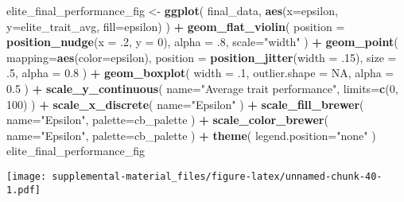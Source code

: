 \documentclass[]{book}
\newenvironment{Shaded}{\begin{snugshade}}{\end{snugshade}}
\newcommand{\DataTypeTok}[1]{\textcolor[rgb]{0.13,0.29,0.53}{#1}}
\newcommand{\DecValTok}[1]{\textcolor[rgb]{0.00,0.00,0.81}{#1}}
\newcommand{\FloatTok}[1]{\textcolor[rgb]{0.00,0.00,0.81}{#1}}
\newcommand{\KeywordTok}[1]{\textcolor[rgb]{0.13,0.29,0.53}{\textbf{#1}}}
\newcommand{\NormalTok}[1]{#1}
\newcommand{\OperatorTok}[1]{\textcolor[rgb]{0.81,0.36,0.00}{\textbf{#1}}}
\newcommand{\OtherTok}[1]{\textcolor[rgb]{0.56,0.35,0.01}{#1}}
\newcommand{\StringTok}[1]{\textcolor[rgb]{0.31,0.60,0.02}{#1}}
\begin{document}
\begin{Shaded}
\begin{Highlighting}[]
\NormalTok{elite_final_performance_fig <-}\StringTok{ }\KeywordTok{ggplot}\NormalTok{(}
\NormalTok{    final_data,}
    \KeywordTok{aes}\NormalTok{(}\DataTypeTok{x=}\NormalTok{epsilon, }\DataTypeTok{y=}\NormalTok{elite_trait_avg, }\DataTypeTok{fill=}\NormalTok{epsilon)}
\NormalTok{  ) }\OperatorTok{+}
\StringTok{  }\KeywordTok{geom_flat_violin}\NormalTok{(}
    \DataTypeTok{position =} \KeywordTok{position_nudge}\NormalTok{(}\DataTypeTok{x =} \FloatTok{.2}\NormalTok{, }\DataTypeTok{y =} \DecValTok{0}\NormalTok{),}
    \DataTypeTok{alpha =} \FloatTok{.8}\NormalTok{,}
    \DataTypeTok{scale=}\StringTok{"width"}
\NormalTok{  ) }\OperatorTok{+}
\StringTok{  }\KeywordTok{geom_point}\NormalTok{(}
    \DataTypeTok{mapping=}\KeywordTok{aes}\NormalTok{(}\DataTypeTok{color=}\NormalTok{epsilon),}
    \DataTypeTok{position =} \KeywordTok{position_jitter}\NormalTok{(}\DataTypeTok{width =} \FloatTok{.15}\NormalTok{),}
    \DataTypeTok{size =} \FloatTok{.5}\NormalTok{,}
    \DataTypeTok{alpha =} \FloatTok{0.8}
\NormalTok{  ) }\OperatorTok{+}
\StringTok{  }\KeywordTok{geom_boxplot}\NormalTok{(}
    \DataTypeTok{width =} \FloatTok{.1}\NormalTok{,}
    \DataTypeTok{outlier.shape =} \OtherTok{NA}\NormalTok{,}
    \DataTypeTok{alpha =} \FloatTok{0.5}
\NormalTok{  ) }\OperatorTok{+}
\StringTok{  }\KeywordTok{scale_y_continuous}\NormalTok{(}
    \DataTypeTok{name=}\StringTok{"Average trait performance"}\NormalTok{,}
    \DataTypeTok{limits=}\KeywordTok{c}\NormalTok{(}\DecValTok{0}\NormalTok{, }\DecValTok{100}\NormalTok{)}
\NormalTok{  ) }\OperatorTok{+}
\StringTok{  }\KeywordTok{scale_x_discrete}\NormalTok{(}
    \DataTypeTok{name=}\StringTok{"Epsilon"}
\NormalTok{  ) }\OperatorTok{+}
\StringTok{  }\KeywordTok{scale_fill_brewer}\NormalTok{(}
    \DataTypeTok{name=}\StringTok{"Epsilon"}\NormalTok{,}
    \DataTypeTok{palette=}\NormalTok{cb_palette}
\NormalTok{  ) }\OperatorTok{+}
\StringTok{  }\KeywordTok{scale_color_brewer}\NormalTok{(}
    \DataTypeTok{name=}\StringTok{"Epsilon"}\NormalTok{,}
    \DataTypeTok{palette=}\NormalTok{cb_palette}
\NormalTok{  ) }\OperatorTok{+}
\StringTok{  }\KeywordTok{theme}\NormalTok{(}
    \DataTypeTok{legend.position=}\StringTok{"none"}
\NormalTok{  )}
\NormalTok{elite_final_performance_fig}
\end{Highlighting}
\end{Shaded}

\texttt{[image: supplemental-material\_files/figure-latex/unnamed-chunk-40-1.pdf]}
\end{document}
